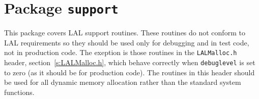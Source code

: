 \chapter{Package \texttt{support}}

This package covers LAL support routines.  These routines do not conform to
LAL requirements so they should be used only for debugging and in test code,
not in production code.  The exeption is those routines in the
\verb+LALMalloc.h+ header, section~\ref{s:LALMalloc.h}, which behave correctly
when \verb+debuglevel+ is set to zero (as it should be for production code).
The routines in this header should be used for all dynamic memory allocation
rather than the standard system functions.

\newpage
\newpage
\newpage
